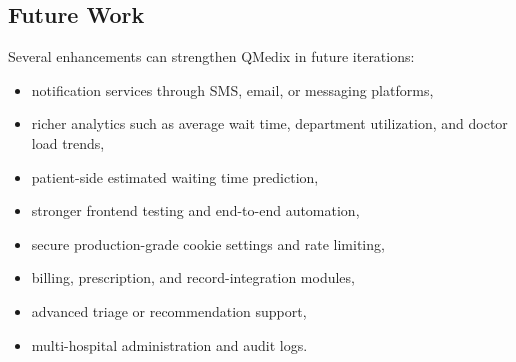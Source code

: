 \documentclass[12pt,onecolumn]{IEEEtran}
\begin{document}
\subsection{Future Work}
Several enhancements can strengthen QMedix in future iterations:
\begin{itemize}
    \item notification services through SMS, email, or messaging platforms,
    \item richer analytics such as average wait time, department utilization, and doctor load trends,
    \item patient-side estimated waiting time prediction,
    \item stronger frontend testing and end-to-end automation,
    \item secure production-grade cookie settings and rate limiting,
    \item billing, prescription, and record-integration modules,
    \item advanced triage or recommendation support,
    \item multi-hospital administration and audit logs.
\end{itemize}

\appendices
\end{document}
